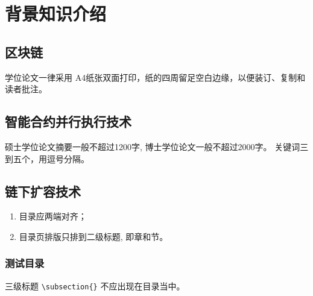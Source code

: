 
\chapter{背景知识介绍}
\section{区块链}
学位论文一律采用 A4纸张双面打印，纸的四周留足空白边缘，以便装订、复制和读者批注。

\section{智能合约并行执行技术}
硕士学位论文摘要一般不超过1200字, 博士学位论文一般不超过2000字。
关键词三到五个，用逗号分隔。

\section{链下扩容技术}
\begin{enumerate}
    \item 目录应两端对齐；
    \item 目录页排版只排到二级标题, 即章和节。
\end{enumerate}

\subsection{测试目录}
三级标题 \verb|\subsection{}| 不应出现在目录当中。

